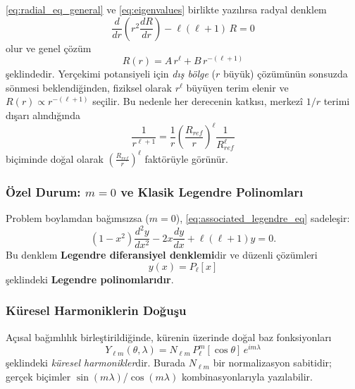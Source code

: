 \eqref{eq:radial_eq_general} ve \eqref{eq:eigenvalues} birlikte yazılırsa radyal denklem
\begin{equation}
\frac{d}{dr}\!\left(r^2\frac{dR}{dr}\right)-\ell(\ell+1)\,R=0
\label{eq:radial_eq_l}
\end{equation}
olur ve genel çözüm
\begin{equation}
R(r)=A\,r^\ell + B\,r^{-(\ell+1)}
\label{eq:radial_solution_general}
\end{equation}
şeklindedir. Yerçekimi potansiyeli için \emph{dış bölge} ($r$ büyük) çözümünün sonsuzda sönmesi beklendiğinden,
fiziksel olarak $r^\ell$ büyüyen terim elenir ve $R(r)\propto r^{-(\ell+1)}$ seçilir.
Bu nedenle her derecenin katkısı, merkezî $1/r$ terimi dışarı alındığında
\begin{equation}
\frac{1}{r^{\ell+1}}
=
\frac{1}{r}\left(\frac{R_{ref}}{r}\right)^\ell \frac{1}{R_{ref}^\ell}
\end{equation}
biçiminde doğal olarak $\left(\frac{R_{ref}}{r}\right)^\ell$ faktörüyle görünür.

\subsubsection{Özel Durum: $m=0$ ve Klasik Legendre Polinomları}

Problem boylamdan bağımsızsa ($m=0$), \eqref{eq:associated_legendre_eq} sadeleşir:
\begin{equation}
(1-x^2)\frac{d^2 y}{dx^2}
-2x\frac{dy}{dx}
+\ell(\ell+1)y=0.
\label{eq:legendre_eq_x}
\end{equation}
Bu denklem \textbf{Legendre diferansiyel denklemi}dir ve düzenli çözümleri
\begin{equation}
y(x)=P_\ell[x]
\label{eq:legendre_poly}
\end{equation}
şeklindeki \textbf{Legendre polinomlarıdır}.

\subsubsection{Küresel Harmoniklerin Doğuşu}
\label{subsubsec:sphharm_birth}

Açısal bağımlılık birleştirildiğinde, kürenin üzerinde doğal baz fonksiyonları
\begin{equation}
Y_{\ell m}(\theta,\lambda)=N_{\ell m}\,P_\ell^m[\cos\theta]\,e^{i m\lambda}
\label{eq:spherical_harmonics_def}
\end{equation}
şeklindeki \emph{küresel harmonikler}dir. Burada $N_{\ell m}$ bir normalizasyon sabitidir;
gerçek biçimler $\sin(m\lambda)$/$\cos(m\lambda)$ kombinasyonlarıyla yazılabilir.

